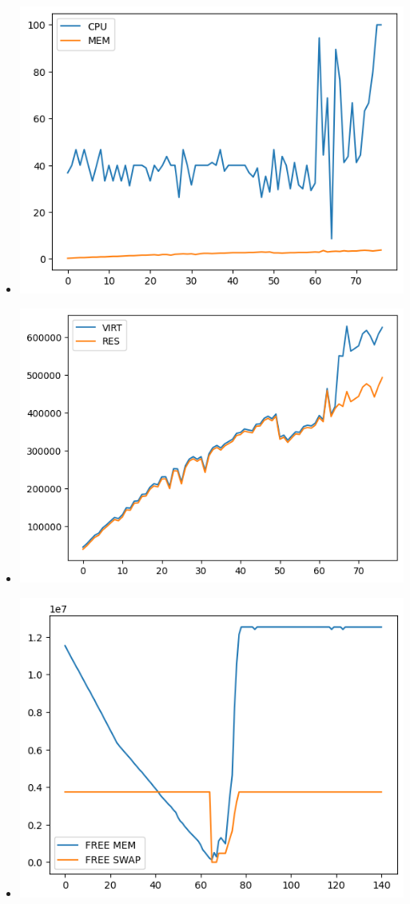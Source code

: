 \documentclass[10pt, a4paper]{article}
\begin{document}
\begin{itemize}
    \item \includegraphics[scale=0.8]{graphs/20.png}
    \item \includegraphics[scale=0.8]{graphs/21.png}
    \item \includegraphics[scale=0.8]{graphs/22.png}
\end{itemize}
\end{document}
